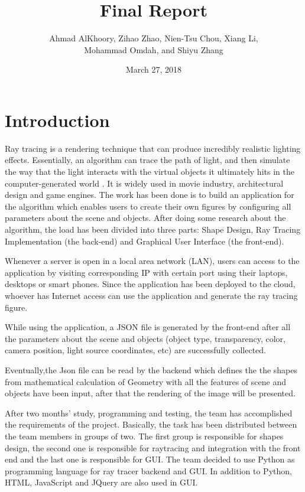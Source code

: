 \documentclass[a4paper, 12pt]{article}
\title{Final Report}
\author{Ahmad AlKhoory, Zihao Zhao, Nien-Tsu Chou, Xiang Li,\\Mohammad Omdah, and Shiyu Zhang}
\date{March 27, 2018}
\begin{document}
\maketitle


\section{Introduction}
Ray tracing is a rendering technique that can produce incredibly realistic lighting effects. Essentially, an algorithm can trace the path of light, and then simulate the way that the light interacts with the virtual objects it ultimately hits in the computer-generated world \cite{Ray tracing}. It is widely used in movie industry, architectural design and game engines. The work has been done is to build an application for the algorithm which enables users to create their own figures by configuring all parameters about the scene and objects. After doing some research about the algorithm, the load has been divided into three parts: Shape Design, Ray Tracing Implementation (the back-end) and Graphical User Interface (the front-end).

Whenever a server is open in a local area network (LAN), users can access to the application by visiting corresponding IP with certain port using their laptops, desktops or smart phones. Since the application has been deployed to the cloud, whoever has Internet access can use the application and generate the ray tracing figure.

While using the application, a JSON file is generated by the front-end after all the parameters about the scene and objects (object type, transparency, color, camera position, light source coordinates, etc) are successfully collected.

Eventually,the Json file can be read by the backend which defines the the shapes from mathematical calculation of Geometry with all the features of scene and objects have been input, after that the rendering of the image will be presented.


After two months' study, programming and testing, the team has accomplished the requirements of the project. Basically, the task has been distributed between the team members in groups of two. The first group is responsible for shapes design, the second one is responsible for raytracing and integration with the front end and the last one is responsible for GUI. The team decided to use Python as programming language for ray tracer backend and GUI. In addition to Python, HTML, JavaScript and JQuery are also used in GUI. 
\end{document}
